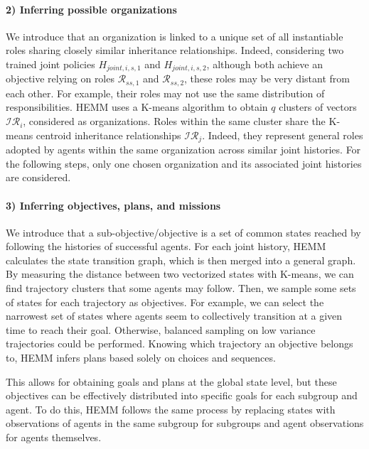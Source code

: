 \documentclass[sigconf,anonymous]{aamas}
\begin{document}
\paragraph{\textbf{2) Inferring possible organizations}}

We introduce that an organization is linked to a unique set of all instantiable roles sharing closely similar inheritance relationships. Indeed, considering two trained joint policies $H_{joint,i,s,1}$ and $H_{joint,i,s,2}$, although both achieve an objective relying on roles $\mathcal{R}_{ss,1}$ and $\mathcal{R}_{ss,2}$, these roles may be very distant from each other. For example, their roles may not use the same distribution of responsibilities.
HEMM uses a K-means algorithm to obtain $q$ clusters of vectors $\mathcal{IR}_{i}$, considered as organizations. Roles within the same cluster share the K-means centroid inheritance relationships $\mathcal{IR}_j$. Indeed, they represent general roles adopted by agents within the same organization across similar joint histories.
For the following steps, only one chosen organization and its associated joint histories are considered.

\paragraph{\textbf{3) Inferring objectives, plans, and missions}}

We introduce that a sub-objective/objective is a set of common states reached by following the histories of successful agents.
For each joint history, HEMM calculates the state transition graph, which is then merged into a general graph. By measuring the distance between two vectorized states with K-means, we can find trajectory clusters that some agents may follow. Then, we sample some sets of states for each trajectory as objectives. For example, we can select the narrowest set of states where agents seem to collectively transition at a given time to reach their goal. Otherwise, balanced sampling on low variance trajectories could be performed. Knowing which trajectory an objective belongs to, HEMM infers plans based solely on choices and sequences.

This allows for obtaining goals and plans at the global state level, but these objectives can be effectively distributed into specific goals for each subgroup and agent. To do this, HEMM follows the same process by replacing states with observations of agents in the same subgroup for subgroups and agent observations for agents themselves.
\end{document}
